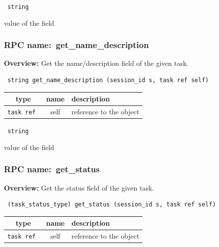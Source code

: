 \vspace{0.3cm}

{\tt 
string
}


value of the field
\vspace{0.3cm}
\vspace{0.3cm}
\vspace{0.3cm}
\subsubsection{RPC name:~get\_name\_description}

{\bf Overview:} 
Get the name/description field of the given task.

\begin{verbatim} string get_name_description (session_id s, task ref self)\end{verbatim}



 
\vspace{0.3cm}
\begin{tabular}{|c|c|p{7cm}|}
 \hline
{\bf type} & {\bf name} & {\bf description} \\ \hline
{\tt task ref } & self & reference to the object \\ \hline 

\end{tabular}

\vspace{0.3cm}

{\tt 
string
}


value of the field
\vspace{0.3cm}
\vspace{0.3cm}
\vspace{0.3cm}
\subsubsection{RPC name:~get\_status}

{\bf Overview:} 
Get the status field of the given task.

\begin{verbatim} (task_status_type) get_status (session_id s, task ref self)\end{verbatim}



 
\vspace{0.3cm}
\begin{tabular}{|c|c|p{7cm}|}
 \hline
{\bf type} & {\bf name} & {\bf description} \\ \hline
{\tt task ref } & self & reference to the object \\ \hline 

\end{tabular}

